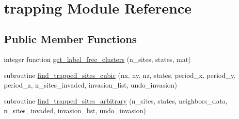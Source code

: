 \hypertarget{classtrapping}{
\section{trapping \-Module \-Reference}
\label{classtrapping}
}
\subsection*{\-Public \-Member \-Functions}
\begin{DoxyCompactItemize}
\item 
integer function \hyperlink{classtrapping_ae50f5e159c5ec1c082750d3ab71155b8}{get\-\_\-label\-\_\-free\-\_\-clusters} (n\-\_\-sites, states, mat)
\item 
subroutine \hyperlink{classtrapping_aac840520b1c47eb7d0ab1b1228d8388d}{find\-\_\-trapped\-\_\-sites\-\_\-cubic} (nx, ny, nz, states, period\-\_\-x, period\-\_\-y, period\-\_\-z, n\-\_\-sites\-\_\-invaded, invasion\-\_\-list, undo\-\_\-invasion)
\item 
subroutine \hyperlink{classtrapping_a7df1599da69c0ed08f2c62d30d26eb9c}{find\-\_\-trapped\-\_\-sites\-\_\-arbitrary} (n\-\_\-sites, states, neighbors\-\_\-data, n\-\_\-sites\-\_\-invaded, invasion\-\_\-list, undo\-\_\-invasion)
\end{DoxyCompactItemize}


